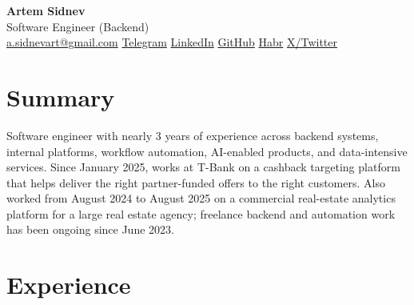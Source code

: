 \documentclass[10pt,a4paper]{article}
\begin{document}
\small

\begin{center}
{\LARGE \textbf{Artem Sidnev}}\\[0.20em]
{\normalsize Software Engineer (Backend)}\\[0.35em]
{\footnotesize
\href{mailto:a.sidnevart@gmail.com}{a.sidnevart@gmail.com}
\enspace\textbar\enspace
\href{https://t.me/sidnevart}{Telegram}
\enspace\textbar\enspace
\href{https://www.linkedin.com/in/artem-sidnev}{LinkedIn}
\enspace\textbar\enspace
\href{https://github.com/sidnevart}{GitHub}
\enspace\textbar\enspace
\href{https://habr.com/ru/users/sidnevart/}{Habr}
\enspace\textbar\enspace
\href{https://x.com/ArtemkaWeb3}{X/Twitter}
}
\end{center}

\vspace{0.06em}

\section*{Summary}
Software engineer with nearly 3 years of experience across backend systems, internal platforms, workflow automation, AI-enabled products, and data-intensive services. Since January 2025, works at T-Bank on a cashback targeting platform that helps deliver the right partner-funded offers to the right customers. Also worked from August 2024 to August 2025 on a commercial real-estate analytics platform for a large real estate agency; freelance backend and automation work has been ongoing since June 2023.

\section*{Experience}
\end{document}
